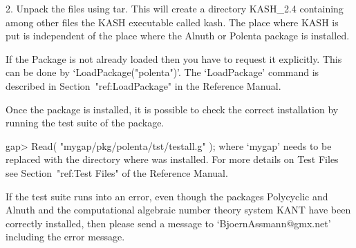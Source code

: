 \item{2.} Unpack the files using tar.  This will create a directory
    KASH_2.4 containing among other files the KASH executable called
    kash.  The place where KASH is put is independent of the place
    where the Alnuth or Polenta package is installed.
    
\endlist
                                                                               


\null

If the {\Polenta} Package is not already loaded 
then you have to request it explicitly. 
This  can be 
done by `LoadPackage("polenta")'.
The `LoadPackage' command is described in Section~"ref:LoadPackage"
in the {\GAP} Reference Manual.


    Once the package is installed, it is possible to check the correct
    installation by running the test suite of the package.

\beginexample
    gap> Read( "mygap/pkg/polenta/tst/testall.g" );
\endexample
    where `mygap' needs to be replaced with the directory where {\GAP}
    was installed. For more details on  Test Files see 
    Section~"ref:Test Files" of the 
    {\GAP} Reference Manual.

    If the test suite runs into an error, even though the packages
    Polycyclic and 
    Alnuth  and  the computational algebraic number theory system KANT
    have been correctly installed, then please send a message
    to `BjoernAssmann@gmx.net' including the error message.



